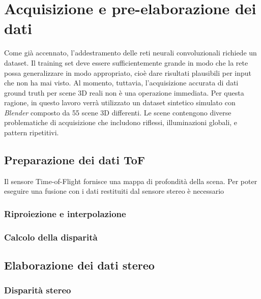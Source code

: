 \chapter{Acquisizione e pre-elaborazione dei dati}
Come già accennato, l'addestramento delle reti neurali convoluzionali richiede un dataset. Il training set deve essere sufficientemente grande in modo che la rete possa generalizzare in modo appropriato, cioè dare risultati plausibili per input che non ha mai visto. Al momento, tuttavia, l'acquisizione accurata di dati ground truth per scene 3D reali non è una operazione immediata. Per questa ragione, in questo lavoro verrà utilizzato un dataset sintetico simulato con \textit{Blender} composto da 55 scene 3D differenti. Le scene contengono diverse problematiche di acquisizione che includono riflessi, illuminazioni globali, e pattern ripetitivi. 

\section{Preparazione dei dati ToF}
Il sensore Time-of-Flight fornisce una mappa di profondità della scena. Per poter eseguire una fusione con i dati restituiti dal sensore stereo è necessario 

\subsection{Riproiezione e interpolazione}

\subsection{Calcolo della disparità}

\section{Elaborazione dei dati stereo}

\subsection{Disparità stereo}